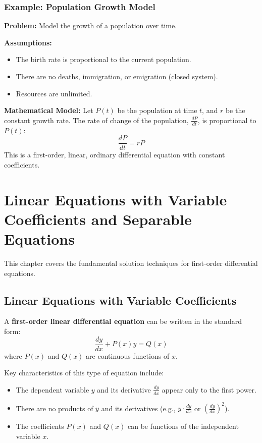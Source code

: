 \documentclass[12pt, letterpaper]{book}
\begin{document}
\subsection{Example: Population Growth Model}
\label{ssec:example_population_growth}
\textbf{Problem:} Model the growth of a population over time.

\textbf{Assumptions:}
\begin{itemize}
    \item The birth rate is proportional to the current population.
    \item There are no deaths, immigration, or emigration (closed system).
    \item Resources are unlimited.
\end{itemize}

\textbf{Mathematical Model:}
Let $P(t)$ be the population at time $t$, and $r$ be the constant growth rate.
The rate of change of the population, $\frac{dP}{dt}$, is proportional to $P(t)$:
\begin{equation}
    \frac{dP}{dt} = rP \label{eq:population_growth}
\end{equation}
This is a first-order, linear, ordinary differential equation with constant coefficients.

\chapter{Linear Equations with Variable Coefficients and Separable Equations}
\label{chap:session_2}

This chapter covers the fundamental solution techniques for first-order differential equations.

\section{Linear Equations with Variable Coefficients}
\label{sec:linear_variable_coeffs}

A \textbf{first-order linear differential equation} can be written in the standard form:
\begin{equation}
    \frac{dy}{dx} + P(x)y = Q(x)
    \label{eq:book_linear_de_standard_form}
\end{equation}
where $P(x)$ and $Q(x)$ are continuous functions of $x$.

Key characteristics of this type of equation include:
\begin{itemize}
    \item The dependent variable $y$ and its derivative $\frac{dy}{dx}$ appear only to the first power.
    \item There are no products of $y$ and its derivatives (e.g., $y \cdot \frac{dy}{dx}$ or $(\frac{dy}{dx})^2$).
    \item The coefficients $P(x)$ and $Q(x)$ can be functions of the independent variable $x$.
\end{itemize}
\end{document}
